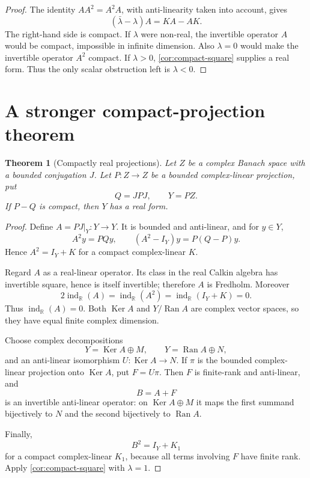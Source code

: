 \documentclass[11pt]{article}
\newtheorem{theorem}{Theorem}[section]
\theoremstyle{definition}
\theoremstyle{remark}
\newcommand{\R}{\mathbb R}
\newcommand{\Ran}{\operatorname{Ran}}
\newcommand{\Ker}{\operatorname{Ker}}
\newcommand{\ind}{\operatorname{ind}}
\begin{document}
\begin{proof}
The identity $AA^2=A^2A$, with anti-linearity taken into account, gives
\[
       (\bar\lambda-\lambda)A=KA-AK.
\]
The right-hand side is compact. If $\lambda$ were non-real, the invertible operator $A$ would be compact, impossible in infinite dimension. Also $\lambda=0$ would make the invertible operator $A^2$ compact. If $\lambda>0$, \cref{cor:compact-square} supplies a real form. Thus the only scalar obstruction left is $\lambda<0$.
\end{proof}

\section{A stronger compact-projection theorem}\label{sec:compact-projection}

\begin{theorem}[Compactly real projections]\label{thm:compactly-real-projection}
Let $Z$ be a complex Banach space with a bounded conjugation $J$. Let $P:Z\to Z$ be a bounded complex-linear projection, put
\[
       Q=JPJ,
       \qquad Y=PZ.
\]
If $P-Q$ is compact, then $Y$ has a real form.
\end{theorem}

\begin{proof}
Define $A=PJ|_Y:Y\to Y$. It is bounded and anti-linear, and for $y\in Y$,
\[
 A^2y=PQy,
 \qquad
 (A^2-I_Y)y=P(Q-P)y.
\]
Hence $A^2=I_Y+K$ for a compact complex-linear $K$.

Regard $A$ as a real-linear operator. Its class in the real Calkin algebra has invertible square, hence is itself invertible; therefore $A$ is Fredholm. Moreover
\[
 2\ind_{\R}(A)=\ind_{\R}(A^2)=\ind_{\R}(I_Y+K)=0.
\]
Thus $\ind_{\R}(A)=0$. Both $\Ker A$ and $Y/\Ran A$ are complex vector spaces, so they have equal finite complex dimension.

Choose complex decompositions
\[
 Y=\Ker A\oplus M,
 \qquad
 Y=\Ran A\oplus N,
\]
and an anti-linear isomorphism $U:\Ker A\to N$. If $\pi$ is the bounded complex-linear projection onto $\Ker A$, put $F=U\pi$. Then $F$ is finite-rank and anti-linear, and
\[
 B=A+F
\]
is an invertible anti-linear operator: on $\Ker A\oplus M$ it maps the first summand bijectively to $N$ and the second bijectively to $\Ran A$.

Finally,
\[
 B^2=I_Y+K_1
\]
for a compact complex-linear $K_1$, because all terms involving $F$ have finite rank. Apply \cref{cor:compact-square} with $\lambda=1$.
\end{proof}
\end{document}
